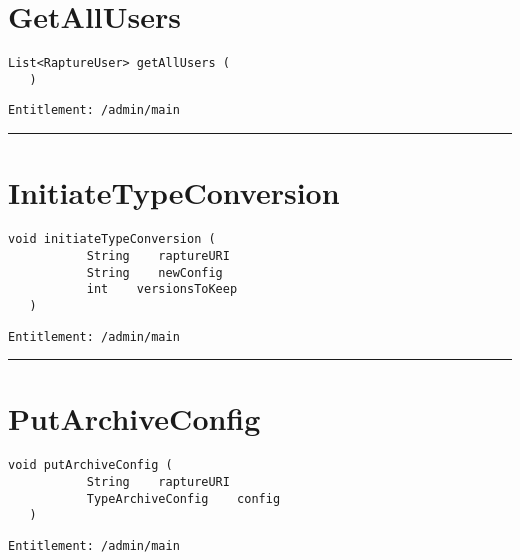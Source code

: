 \section{GetAllUsers}
\label{Api:GetAllUsers}
\begin{lstlisting}[style=nonumbers]
   List<RaptureUser> getAllUsers (
   )
\end{lstlisting}
\begin{Verbatim}[formatcom=\color{Maroon}]
  Entitlement: /admin/main
\end{Verbatim}



\rule{12cm}{2pt}
\section{InitiateTypeConversion}
\label{Api:InitiateTypeConversion}
\begin{lstlisting}[style=nonumbers]
   void initiateTypeConversion (
           String    raptureURI
           String    newConfig
           int    versionsToKeep
   )
\end{lstlisting}
\begin{Verbatim}[formatcom=\color{Maroon}]
  Entitlement: /admin/main
\end{Verbatim}



\rule{12cm}{2pt}
\section{PutArchiveConfig}
\label{Api:PutArchiveConfig}
\begin{lstlisting}[style=nonumbers]
   void putArchiveConfig (
           String    raptureURI
           TypeArchiveConfig    config
   )
\end{lstlisting}
\begin{Verbatim}[formatcom=\color{Maroon}]
  Entitlement: /admin/main
\end{Verbatim}



